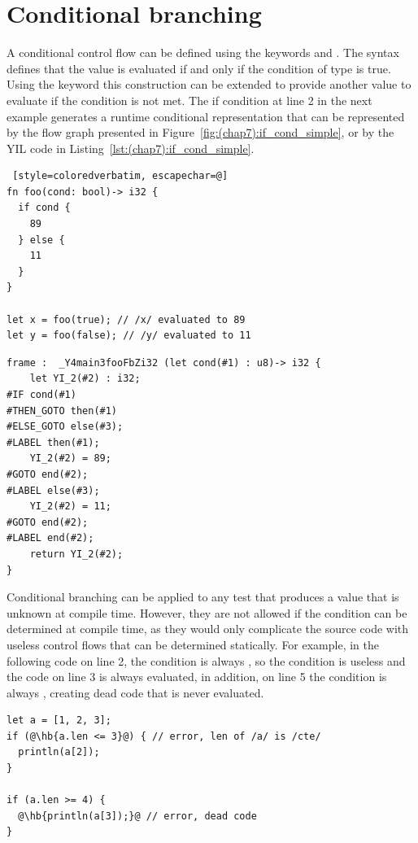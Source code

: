 \section{Conditional branching}%
\label{sec:if_else}

A conditional control flow can be defined using the keywords  and
. The syntax  defines that the value  is
evaluated if and only if the condition  of type  is true.
Using the keyword  this construction can be extended to provide
another value to evaluate if the condition is not met. The if condition at line
2 in the next example generates a runtime conditional representation that can be
represented by the flow graph presented in Figure~\ref{fig:(chap7):if_cond_simple}, or
by the YIL code in Listing~\ref{lst:(chap7):if_cond_simple}.

\begin{lstlisting} [style=coloredverbatim, escapechar=@]
fn foo(cond: bool)-> i32 {
  if cond {
    89
  } else {
    11
  }
}

let x = foo(true); // /x/ evaluated to 89
let y = foo(false); // /y/ evaluated to 11
\end{lstlisting}

\begin{lstlisting}[style=lyilVerb, caption=Simple condition, label=lst:(chap7):if_cond_simple]
frame :  _Y4main3fooFbZi32 (let cond(#1) : u8)-> i32 {
    let YI_2(#2) : i32;
#IF cond(#1)
#THEN_GOTO then(#1)
#ELSE_GOTO else(#3);
#LABEL then(#1);
    YI_2(#2) = 89;
#GOTO end(#2);
#LABEL else(#3);
    YI_2(#2) = 11;
#GOTO end(#2);
#LABEL end(#2);
    return YI_2(#2);
}
\end{lstlisting}



Conditional branching can be applied to any test that produces a 
value that is unknown at compile time. However, they are not allowed if the
condition can be determined at compile time, as they would only complicate the
source code with useless control flows that can be determined statically. For
example, in the following code on line 2, the condition is always ,
so the condition is useless and the code on line 3 is always evaluated, in
addition, on line 5 the condition is always , creating dead code
that is never evaluated.

\begin{lstlisting}[style=coloredverbatimError, escapechar=@]
let a = [1, 2, 3];
if (@\hb{a.len <= 3}@) { // error, len of /a/ is /cte/
  println(a[2]);
}

if (a.len >= 4) {
  @\hb{println(a[3]);}@ // error, dead code
}
\end{lstlisting}

